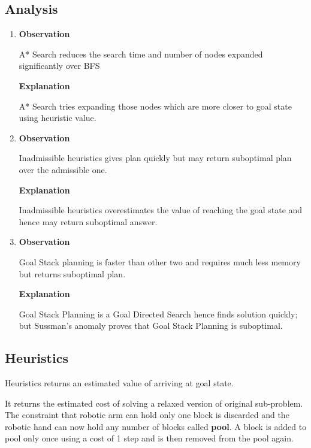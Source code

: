 \documentclass[32pt]{article}
\begin{document}
\subsection{Analysis}
\begin{enumerate}
    \item 
    \textbf{Observation} 
    
    A* Search reduces the search time and number of nodes expanded significantly over BFS 
    
    \textbf{Explanation} 
    
    A* Search tries expanding those nodes which are more closer to goal state using heuristic value.
    
     \item 
    
    \textbf{Observation} 
    
    Inadmissible heuristics gives plan quickly but may return suboptimal plan over the admissible one.
    
    \textbf{Explanation} 
    
    Inadmissible heuristics overestimates the value of reaching the goal state and hence may return suboptimal answer.
    
    
    \item 
    
    \textbf{Observation} 
    
    Goal Stack planning is faster than other two and requires much less memory but returns suboptimal plan.
    
    \textbf{Explanation} 
    
    Goal Stack Planning is a Goal Directed Search hence finds solution quickly; but Sussman's anomaly proves that Goal Stack Planning is suboptimal.
    
    
\end{enumerate}

\vfill

\subsection{Heuristics}

Heuristics returns an estimated value of arriving at goal state.

It returns the estimated cost of solving a relaxed version of original sub-problem. The constraint that robotic arm can hold only one block is discarded and the robotic hand can now hold any number of blocks called \textbf{pool}. A block is added to pool only once using a cost of 1 step and is then removed from the pool again.
\end{document}
